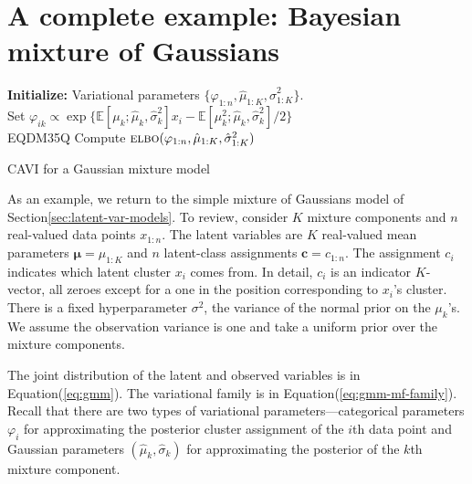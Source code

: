 \documentclass{article}
\DeclareRobustCommand{\mb}[1]{\ensuremath{\boldsymbol{\mathbf{#1}}}}
\begin{document}
 \section{A complete example: Bayesian mixture of Gaussians}
\label{sec:mog}

\begin{algorithm}[t]



\textbf{Initialize:} Variational parameters $\{\varphi_{1:n},
\hat{\mu}_{1:K}, \hat{\sigma}_{1:K}^2\}$.\\

 {
  {
    Set $\varphi_{ik} \propto \exp\{{\mathbb{E}\left[{\mu_k; \hat{\mu}_k,
      \hat{\sigma}_k^2}\right]} x_i - {\mathbb{E}\left[{\mu_k^2; \hat{\mu}_k, \hat{\sigma}_k^2}\right]} / 2\}$\\
  }
  {
    EQDM35Q
  }
  Compute ${\textsc{elbo}}(\varphi_{1:n}, \hat{\mu}_{1:K}, \hat{\sigma}^2_{1:K})$
}
\caption{\gls{CAVI} for a Gaussian mixture model}
\label{alg:gmm-cavi}
\end{algorithm}

As an example, we return to the simple mixture of Gaussians model of
Section\nobreakspace \ref {sec:latent-var-models}. To review, consider $K$ mixture
components and $n$ real-valued data points $x_{1:n}$. The latent
variables are $K$ real-valued mean parameters ${\mb{\mu}} = \mu_{1:K}$ and
$n$ latent-class assignments ${\mathbf{c}} = c_{1:n}$. The assignment $c_i$
indicates which latent cluster $x_i$ comes from. In detail, $c_i$ is
an indicator $K$-vector, all zeroes except for a one in the position
corresponding to $x_i$'s cluster. There is a fixed hyperparameter
$\sigma^2$, the variance of the normal prior on the $\mu_k$'s. We
assume the observation variance is one and take a uniform prior over
the mixture components.

The joint distribution of the latent and observed variables is in
Equation\nobreakspace \textup {(\ref {eq:gmm})}.  The variational family is in Equation\nobreakspace \textup {(\ref {eq:gmm-mf-family})}.
Recall that there are two types of variational
parameters---categorical parameters $\varphi_i$ for approximating the
posterior cluster assignment of the $i$th data point and Gaussian
parameters $(\hat{\mu}_k, \hat{\sigma}_k)$ for approximating the
posterior of the $k$th mixture component.
\end{document}
